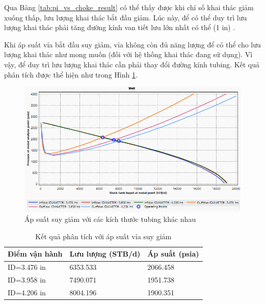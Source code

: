 \documentclass[12pt,a4paper]{report}
\begin{document}
Qua Bảng \ref{tab:pi_vs_choke_result} có thể thấy được khi chỉ số khai thác giảm xuống thấp, lưu lượng khai thác bắt đầu giảm. Lúc này, để có thể duy trì lưu lượng khai thác phải tăng đường kính van tiết lưu lớn nhất có thể (1 in) .

Khi áp suất vỉa bắt đầu suy giảm, vỉa không còn đủ năng lượng để có thể cho lưu lượng khai thác như mong muốn (đối với hệ thống khai thác đang sử dụng). Vì vậy, để duy trì lưu lượng khai thác cần phải thay đổi đường kính tubing. Kết quả phân tích được thể hiện như trong Hình \ref{fig:decrease_press_vs_tubing}.

	\begin{figure}[h]
		\centering
		\includegraphics[scale=0.75]{Fig/decrease_press_vs_tubing.PNG}
		\caption{Áp suất suy giảm với các kích thước tubing khác nhau}
		\label{fig:decrease_press_vs_tubing}
	\end{figure}

\begin{table}[h]
\caption{Kết quả phân tích với áp suất vỉa suy giảm}\label{tab:decrease_press_vs_tubing_result}
\begin{tabularx}{\textwidth}{@{}XXX@{}}
\toprule
Điểm vận hành & Lưu lượng (STB/d) & Áp suất (psia) \\ \midrule
ID=3.476 in   & 6353.533          & 2066.458       \\
ID=3.958 in   & 7490.071          & 1951.738       \\
ID=4.206 in   & 8004.196          & 1900.351       \\ \bottomrule
\end{tabularx}
\end{table}
\end{document}
